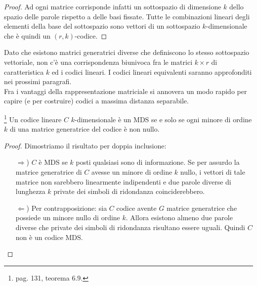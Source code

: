 \begin{proof}
   Ad ogni matrice corrisponde infatti un sottospazio di dimensione $k$ dello spazio delle parole rispetto a delle basi fissate. Tutte le combinazioni lineari degli elementi della base del sottospazio sono vettori di un sottospazio $k$-dimensionale che è quindi un $(r,k)$-codice.
\end{proof}
\noindent
Dato che esistono matrici generatrici diverse che definiscono lo stesso sottospazio vettoriale, non c'è una corrispondenza biunivoca fra le matrici $k\times r$ di caratteristica $k$ ed i codici lineari. I codici lineari equivalenti saranno approfonditi nei prossimi paragrafi. \\
Fra i vantaggi della rappresentazione matriciale si annovera un modo rapido per capire (e per costruire) codici a massima distanza separabile.
\begin{teorema} \footnote{\cite{berardi} pag. 131, teorema $6.9$.}
   Un codice lineare $C$ $k$-dimensionale è un MDS se e solo se ogni minore di ordine $k$ di una matrice generatrice del codice è non nullo.
\end{teorema}
\begin{proof}
   Dimostriamo il risultato per doppia inclusione:
   \begin{itemize}
   \item[$\Rightarrow$)] $C$ è MDS se $k$ posti qualsiasi sono di informazione. Se per assurdo la matrice generatrice di $C$ avesse un minore di ordine $k$ nullo, i vettori di tale matrice non sarebbero linearmente indipendenti e due parole diverse di lunghezza $k$ private dei simboli di ridondanza coinciderebbero.
   \item[$\Leftarrow$)] Per contrapposizione: sia $C$ codice avente $G$ matrice generatrice che possiede un minore nullo di ordine $k$. Allora esistono almeno due parole diverse che private dei simboli di ridondanza risultano essere uguali. Quindi $C$ non è un codice MDS.
\end{itemize}
\end{proof}

